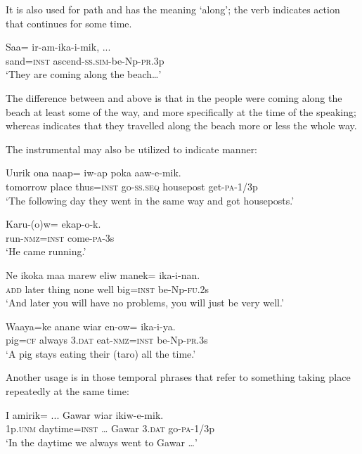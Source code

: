 It is also used for path and has the meaning `along'; the verb indicates action that continues for some time.

\ea%
\label{ex:3:x767}
\gll Saa= ir-am-ika-i-mik, ... \\
sand=\textsc{inst} ascend-\textsc{ss}.\textsc{sim}-be-Np-\textsc{pr}.3p\\
\glt`They are coming along the beach{\dots}'
\z

The difference between  and  above is that in  the people were coming along the beach at least some of the way, and more specifically at the time of the speaking; whereas  indicates that they travelled along the beach more or less the whole way.

The instrumental may also be utilized to indicate manner: 

\ea%
\label{ex:3:x1881}
\gll Uurik ona naap= iw-ap poka aaw-e-mik. \\
tomorrow place thus=\textsc{inst} go-\textsc{ss}.\textsc{seq} housepost get-\textsc{pa}-1/3p\\
\glt`The following day they went in the same way and got houseposts.'
\z

\ea%
\label{ex:3:x773}
\gll Karu-(o)w= ekap-o-k. \\
run-\textsc{nmz}=\textsc{inst} come-\textsc{pa}-3s\\
\glt`He came running.'
\z

\ea%
\label{ex:3:x1814}
\gll Ne ikoka maa marew eliw  manek= ika-i-nan. \\
\textsc{add} later thing none well big=\textsc{inst} be-Np-\textsc{fu}.2s\\
\glt`And later you will have no problems, you will just be very well.'
\z

\ea%
\label{ex:3:x774}
\gll Waaya=ke anane wiar en-ow= ika-i-ya. \\
pig=\textsc{cf} always 3.\textsc{dat} eat-\textsc{nmz}=\textsc{inst} be-Np-\textsc{pr}.3s\\
\glt`A pig stays eating their (taro) all the time.'
\z

Another usage is in those temporal phrases that refer to something taking place repeatedly at the same time: 

\ea%
\label{ex:3:x1882}
\gll I amirik= ... Gawar wiar ikiw-e-mik. \\
1p.\textsc{unm} daytime=\textsc{inst} {\dots} Gawar 3.\textsc{dat} go-\textsc{pa}-1/3p\\
\glt`In the daytime we always went to Gawar {\dots}'
\z


